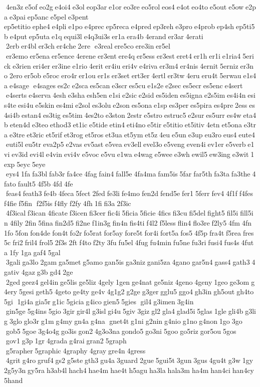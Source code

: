  4en3z e5of eo2g e4oi4 e3ol eop3ar e1or eo3re eo5rol eos4 e4ot eo4to e5out e5ow e2pa e3pai ep5anc e5pel e3pent 	ep5etitio ephe4 e4pli e1po e4prec ep5reca e4pred ep3reh e3pro e4prob ep4sh ep5ti5b e4put ep5uta e1q equi3l e4q3ui3s er1a era4b 4erand er3ar 4erati  2erb er4bl er3ch er4che 2ere  e3real ere5co ere3in er5el  er3emo er5ena er5ence 4erene er3ent ere4q er5ess er3est eret4 er1h er1i e1ria4 5erick e3rien eri4er er3ine e1rio 4erit er4iu eri4v e4riva er3m4 er4nis 4ernit 5erniz er3no 2ero er5ob e5roc ero4r er1ou er1s er3set ert3er 4ertl er3tw 4eru eru4t 5erwau e1s4a e4sage  e4sages es2c e2sca es5can e3scr es5cu e1s2e e2sec es5ecr es5enc e4sert  e4serts e4serva 4esh e3sha esh5en e1si e2sic e2sid es5iden es5igna e2s5im es4i4n esis4te esi4u e5skin es4mi e2sol es3olu e2son es5ona e1sp es3per es5pira es4pre 2ess es4si4b estan4 es3tig es5tim 4es2to e3ston 2estr e5stro estruc5 e2sur es5urr es4w eta4b eten4d e3teo ethod3 et1ic e5tide etin4 eti4no e5tir e5titio et5itiv 4etn et5ona e3tra e3tre et3ric et5rif et3rog et5ros et3ua et5ym et5z 4eu e5un e3up eu3ro eus4 eute4 euti5l eu5tr eva2p5 e2vas ev5ast e5vea ev3ell evel3o e5veng even4i ev1er e5verb e1vi ev3id evi4l e4vin evi4v e5voc e5vu e1wa e4wag e5wee e3wh ewil5 ew3ing e3wit 1exp 5eyc 5eye  eys4 1fa fa3bl fab3r fa4ce 4fag fain4 fall5e 4fa4ma fam5is 5far far5th fa3ta fa3the 4fato fault5 4f5b 4fd 4fe  feas4 feath3 fe4b 4feca 5fect 2fed fe3li fe4mo fen2d fend5e fer1 5ferr fev4 4f1f f4fes f4fie f5fin  f2f5is f4fly f2fy 4fh 1fi fi3a 2f3ic  4f3ical f3ican 4ficate f3icen fi3cer fic4i 5ficia 5ficie 4fics fi3cu fi5del fight5 fil5i fill5in 4fily 2fin 5fina fin2d5 fi2ne f1in3g fin4n fis4ti f4l2 f5less flin4 flo3re f2ly5 4fm 4fn 1fo 5fon fon4de fon4t fo2r fo5rat for5ay fore5t for4i fort5a fos5 4f5p fra4t f5rea fres5c fri2 fril4 frol5 2f3s 2ft f4to f2ty 3fu fu5el 4fug fu4min fu5ne fu3ri fusi4 fus4s 4futa 1fy 1ga gaf4 5gal  3gali ga3lo 2gam ga5met g5amo gan5is ga3niz gani5za 4gano gar5n4 gass4 gath3 4gativ 4gaz g3b gd4 2ge  2ged geez4 gel4in ge5lis ge5liz 4gely 1gen ge4nat ge5niz 4geno 4geny 1geo ge3om g4ery 5gesi geth5 4geto ge4ty ge4v 4g1g2 g2ge g3ger gglu5 ggo4 gh3in gh5out gh4to 5gi  1gi4a gia5r g1ic 5gicia g4ico gien5 5gies  gil4 g3imen 3g4in  gin5ge 5g4ins 5gio 3gir gir4l g3isl gi4u 5giv 3giz gl2 gla4 glad5i 5glas 1gle gli4b g3lig 3glo glo3r g1m g4my gn4a g4na  gnet4t g1ni g2nin g4nio g1no g4non 1go 3go  gob5 5goe 3g4o4g go3is gon2 4g3o3na gondo5 go3ni 5goo go5riz gor5ou 5gos  gov1 g3p 1gr 4grada g4rai gran2 5graph  g5rapher 5graphic 4graphy 4gray gre4n 4gress  4grit g4ro gruf4 gs2 g5ste gth3 gu4a 3guard 2gue 5gui5t 3gun 3gus 4gu4t g3w 1gy 2g5y3n gy5ra h3ab4l hach4 hae4m hae4t h5agu ha3la hala3m ha4m han4ci han4cy 5hand 